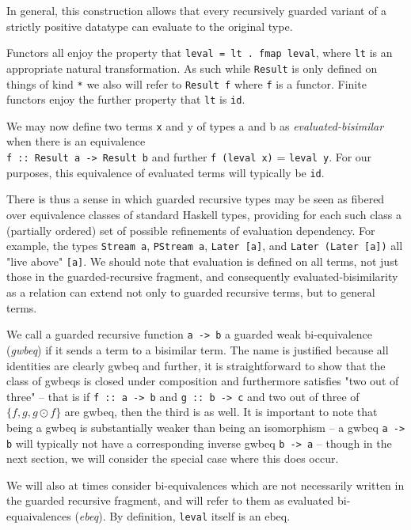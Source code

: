 \documentclass[hoptionsi,review,format=sigplan]{acmart}
\newcommand{\hs}{\texttt}
\newcommand{\hsn}{\texttt}
\begin{document}
In general, this construction allows that every recursively guarded variant of a strictly positive datatype can evaluate to the original type.

Functors all enjoy the property that \hs{leval = lt . fmap leval}, where \hs{lt} is an appropriate natural transformation. As such while \hs{Result} is only defined on things of kind \hs{*} we also will refer to \hs{Result f} where \hs{f} is a functor. Finite functors enjoy the further property that \hs{lt} is \hs{id}.

We may now define two terms \hs{x} and {y} of types {a} and {b} as \emph{evaluated-bisimilar}  when there is an equivalence \\ \hs{f :: Result a -> Result b} and further \hsn{f (leval x)} = \hs{leval y}. For our purposes, this equivalence of evaluated terms will typically be \hs{id}. 

There is thus a sense in which guarded recursive types may be seen as fibered over equivalence classes of standard Haskell types, providing for each such class a (partially ordered) set of possible refinements of evaluation dependency. For example, the types \hs{Stream a}, \hs{PStream a}, \hs{Later [a]}, and \hs{Later (Later [a])} all "live above" \hs{[a]}. We should note that evaluation is defined on all terms, not just those in the guarded-recursive fragment, and consequently evaluated-bisimilarity as a relation can extend not only to guarded recursive terms, but to general terms.

We call a guarded recursive function \hs{a -> b} a guarded weak bi-equivalence (\emph{gwbeq}) if it sends a term to a bisimilar term. The name is justified because all identities are clearly gwbeq and further, it is straightforward to show that the class of gwbeqs is closed under composition and furthermore satisfies "two out of three" -- that is if  \hs{f :: a -> b} and \hs{g :: b -> c} and two out of three of $\{f, g, g \odot f\}$ are gwbeq, then the third is as well. It is important to note that being a gwbeq is substantially weaker than being an isomorphism -- a gwbeq \hs{a -> b} will typically not have a corresponding inverse gwbeq \hs{b -> a} -- though in the next section, we will consider the special case where this does occur.
 
We will also at times consider bi-equivalences which are not necessarily written in the guarded recursive fragment, and will refer to them as evaluated bi-equaivalences (\emph{ebeq}). By definition, \hs{leval} itself is an ebeq.
\end{document}
